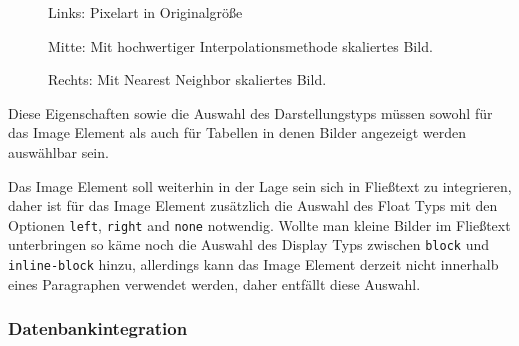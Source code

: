 \begin{figure}
  Links: Pixelart in Originalgröße

  Mitte: Mit hochwertiger Interpolationsmethode skaliertes Bild.

  Rechts: Mit Nearest Neighbor skaliertes Bild.

\end{figure}

Diese Eigenschaften sowie die Auswahl des Darstellungstyps müssen sowohl für das
Image Element als auch für Tabellen in denen Bilder angezeigt werden auswählbar
sein.

Das Image Element soll weiterhin in der Lage sein sich in Fließtext zu
integrieren, daher ist für das Image Element zusätzlich die Auswahl des Float
Typs mit den Optionen \texttt{left}, \texttt{right} and \texttt{none} notwendig.
Wollte man kleine Bilder im Fließtext unterbringen so käme noch die Auswahl des
Display Typs zwischen \texttt{block} und \texttt{inline-block} hinzu, allerdings
kann das Image Element derzeit nicht innerhalb eines Paragraphen verwendet
werden, daher entfällt diese Auswahl.

\cleardoublepage
\subsubsection{Datenbankintegration}

